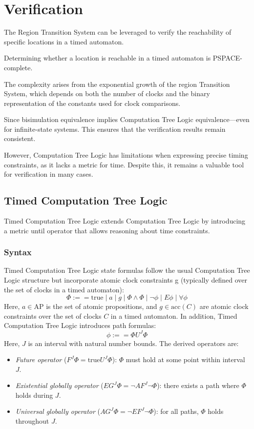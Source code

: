 \section{Verification}

The Region Transition System can be leveraged to verify the reachability of specific locations in a timed automaton.
\begin{theorem}
    Determining whether a location is reachable in a timed automaton is PSPACE-complete.
\end{theorem}
\noindent The complexity arises from the exponential growth of the region Transition System, which depends on both the number of clocks and the binary representation of the constants used for clock comparisons.

Since bisimulation equivalence implies Computation Tree Logic equivalence—even for infinite-state systems.
This ensures that the verification results remain consistent.

However, Computation Tree Logic has limitations when expressing precise timing constraints, as it lacks a metric for time. 
Despite this, it remains a valuable tool for verification in many cases.

\subsection{Timed Computation Tree Logic}
Timed Computation Tree Logic extends Computation Tree Logic by introducing a metric until operator that allows reasoning about time constraints.

\subsubsection{Syntax}
Timed Computation Tree Logic state formulas follow the usual Computation Tree Logic structure but incorporate atomic clock constraints g (typically defined over the set of clocks in a timed automaton):
\[\Phi:==\text{true}\mid a \mid g \mid \Phi \land \Phi \mid \lnot\phi \mid E\phi\mid \forall\phi\]
\noindent Here, $a\in\text{AP}$ is the set of atomic propositions, and $g\in\text{acc}(C)$ are atomic clock constraints over the set of clocks $C$ in a timed automaton. 
In addition, Timed Computation Tree Logic introduces path formulas:
\[\phi:==\Phi U^J\Phi\]
\noindent Here, $J$ is an interval with natural number bounds.
The derived operators are: 
\begin{itemize}
    \item \textit{Future operator} ($F^J\Phi=\text{true}U^J\Phi$): $\Phi$ must hold at some point within interval $J$.
    \item \textit{Existential globally operator} ($EG^J\Phi=\lnot AF^J\lnot\Phi$): there exists a path where $\Phi$ holds during $J$.
    \item \textit{Universal globally operator} ($AG^J\Phi=\lnot EF^J\lnot\Phi$): for all paths, $\Phi$ holds throughout $J$.
\end{itemize}

